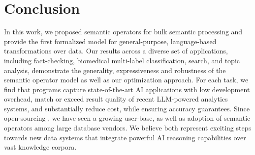 \section{Conclusion}
In this work, we proposed semantic operators for bulk semantic processing and provide the first formalized model for general-purpose, language-based transformations over data. 
Our results across a diverse set of applications, including fact-checking, biomedical multi-label classification, search, and topic analysis, demonstrate the generality, expressiveness and robustness of the semantic operator model as well as our optimization approach. For each task, we find that \sys programs capture state-of-the-art AI applications with low development overhead, match or exceed result quality of recent LLM-powered analytics systems, and substantially reduce cost, while ensuring accuracy guarantees. 
Since open-sourcing \sys, we have seen a growing user-base, as well as adoption of semantic operators among large database vendors. We believe both represent exciting steps towards new data systems that integrate powerful AI reasoning capabilities over vast knowledge corpora.